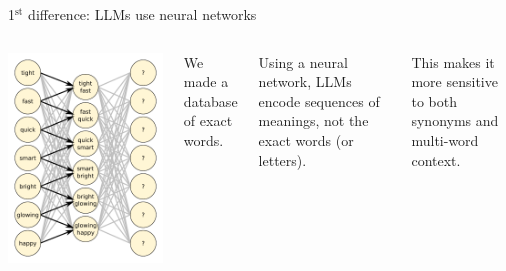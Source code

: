 \documentclass[aspectratio=169]{beamer}
\begin{document}
\begin{frame}{1$^{\mbox{st}}$ difference: LLMs use neural networks}
\Large
\vspace{0.35 cm}
\begin{columns}
\includegraphics[width=\linewidth]{neural-network-for-language.pdf}

We made a database of exact words.

\vspace{0.5 cm}
Using a neural network, LLMs encode sequences of meanings, not the exact words (or letters).

\vspace{0.5 cm}
This makes it more sensitive to both synonyms and multi-word context.
\end{columns}
\end{frame}
\end{document}
